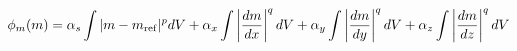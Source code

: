 \begin{equation}
    \phi_m(m) =
    \alpha_s\int |m - m_{{\rm ref}}|^p dV
    +
    \alpha_x\int \left|\frac{dm}{dx}\right|^{q} dV
    +
    \alpha_y\int \left|\frac{dm}{dy}\right|^{q} dV
    +
    \alpha_z\int \left|\frac{dm}{dz}\right|^{q} dV
    \label{eq:model-norm}
\end{equation}
